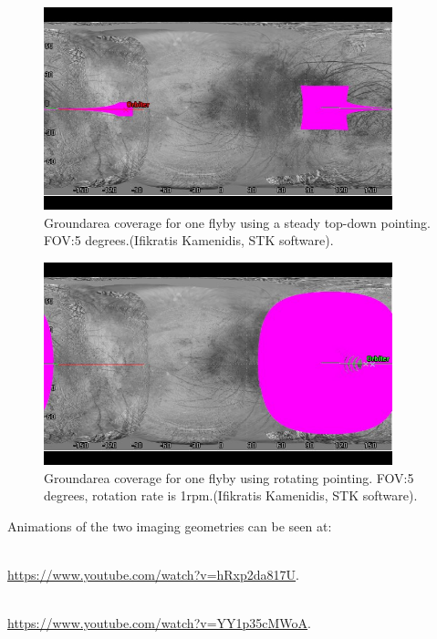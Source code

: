 \begin{figure}[htb!]
\centering
\includegraphics[width=0.9\textwidth]{figures/Orbiter/steady_cover.png}
\caption{Groundarea coverage for one flyby using a steady top-down pointing. FOV:5 degrees.(Ifikratis Kamenidis, STK software).}
\label{steadycov}
\end{figure}
\begin{figure}[htb!]
\centering
\includegraphics[width=0.9\textwidth]{figures/Orbiter/rot_cover.png}
\caption{Groundarea coverage for one flyby using rotating pointing. FOV:5 degrees, rotation rate is 1rpm.(Ifikratis Kamenidis, STK software).}
\label{rot_cover}
\end{figure}

Animations of the two imaging geometries can be seen at:
\begin{description}[align=left]
\item [Steady top-down pointing:]\hfill \\
\url{https://www.youtube.com/watch?v=hRxp2da817U}.
\item [Rotating pointing:]\hfill \\
\url{https://www.youtube.com/watch?v=YY1p35cMWoA}.
\end{description}


